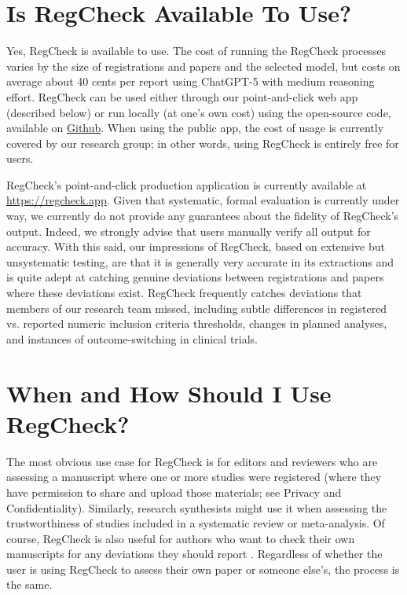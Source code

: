 \documentclass{article}
\begin{document}
\section{Is RegCheck Available To Use?}
Yes, RegCheck is available to use. The cost of running the RegCheck processes varies by the size of registrations and papers and the selected model, but costs on average about 40 cents per report using ChatGPT-5 with medium reasoning effort. RegCheck can be used either through our point-and-click web app (described below) or run locally (at one's own cost) using the open-source code, available on \href{https://github.com/JamieCummins/regcheck}{Github}. When using the public app, the cost of usage is currently covered by our research group; in other words, using RegCheck is entirely free for users.

RegCheck's point-and-click production application is currently available at \href{https://regcheck.app}{https://regcheck.app}. Given that systematic, formal evaluation is currently under way, we currently do not provide any guarantees about the fidelity of RegCheck's output. Indeed, we strongly advise that users manually verify all output for accuracy. With this said, our impressions of RegCheck, based on extensive but unsystematic testing, are that it is generally very accurate in its extractions and is quite adept at catching genuine deviations between registrations and papers where these deviations exist. RegCheck frequently catches deviations that members of our research team missed, including subtle differences in registered vs. reported numeric inclusion criteria thresholds, changes in planned analyses, and instances of outcome-switching in clinical trials.

\section{When and How Should I Use RegCheck?}
The most obvious use case for RegCheck is for editors and reviewers who are assessing a manuscript where one or more studies were registered (where they have permission to share and upload those materials; see Privacy and Confidentiality). Similarly, research synthesists might use it when assessing the trustworthiness of studies included in a systematic review or meta-analysis. Of course, RegCheck is also useful for authors who want to check their own manuscripts for any deviations they should report \cite[e.g., RegCheck could help to spot registration deviations that might be missing in a registration deviation table, like the one suggested by][]{willroth_best_2024}. Regardless of whether the user is using RegCheck to assess their own paper or someone else's, the process is the same.
\end{document}
